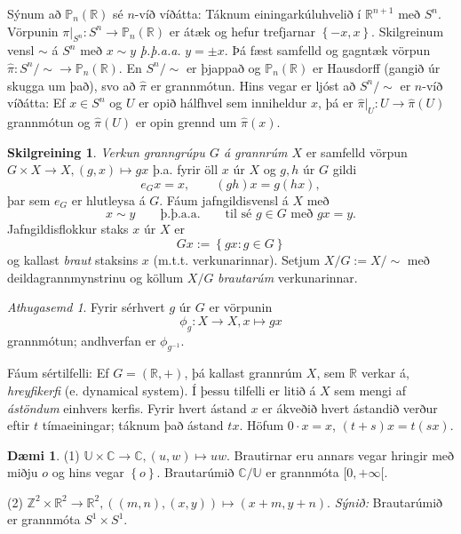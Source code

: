 \documentclass[a4paper,icelandic]{book}
\theoremstyle{definition}
\newtheorem{skilgr}{Skilgreining}[section]
\newtheorem{daemi}{Dæmi}[section]
\theoremstyle{plain}
\theoremstyle{remark}
\newtheorem*{ath}{Athugasemd}
\newcommand{\R}{\mathbb{R}} %
\newcommand{\Z}{\mathbb{Z}} %
\newcommand{\C}{\mathbb{C}} %
\begin{document}
Sýnum að $\mathbb P_n(\R)$ sé $n$-víð víðátta: Táknum einingarkúluhvelið
í $\R^{n+1}$ með $S^n$. Vörpunin $\pi|_{S^n} : S^n \to \mathbb P_n(\R)$
er átæk og hefur trefjarnar $\left\{ -x,x \right\}$. Skilgreinum vensl
$\sim$ á $S^n$ með $x\sim y$ \emph{þ.þ.a.a.} $y=\pm x$. Þá fæst samfelld
og gagntæk vörpun $\hat\pi : S^n/\sim \to \mathbb P_n(\R)$. En
$S^n/\sim$ er þjappað og $\mathbb P_n(\R)$ er Hausdorff (gangið úr
skugga um það), svo að $\hat\pi$ er grannmótun. Hins vegar er ljóst að
$S^n/\sim$ er $n$-víð víðátta: Ef $x\in S^n$ og $U$ er opið hálfhvel sem
inniheldur $x$, þá er $\hat\pi|_U : U \to \hat\pi(U)$ grannmótun og
$\hat\pi(U)$ er opin grennd um $\hat\pi(x)$. 

\begin{skilgr}
  \emph{Verkun granngrúpu $G$ á grannrúm $X$} er samfelld vörpun $G\times X\to X, (g,x)\mapsto gx$ þ.a.
  fyrir öll $x$ úr $X$ og $g,h$ úr $G$ gildi\[
  e_G x = x,
  \qquad (gh)x = g(hx),
  \]
  þar sem $e_G$ er hlutleysa á $G$. Fáum jafngildisvensl á $X$ með\[
  x\sim y
  \qquad\text{þ.þ.a.a.}\qquad
  \text{til sé } g\in G \text{ með } gx = y.
  \]
  Jafngildisflokkur staks $x$ úr $X$ er\[
  Gx := \left\{ gx : g\in G \right\}
  \]
  og kallast \emph{braut} staksins $x$ (m.t.t.
  verkunarinnar). Setjum $X/G := X/\sim$ með deildagrannmynstrinu og
  köllum $X/G$ \emph{brautarúm} verkunarinnar.
\end{skilgr}
\begin{ath}
  Fyrir sérhvert $g$ úr $G$ er vörpunin\[
  \phi_g : X\to X, x\mapsto gx
  \]
  grannmótun; andhverfan er $\phi_{g^{-1}}$. 
\end{ath}
Fáum sértilfelli: Ef $G = (\R,+)$, þá kallast grannrúm $X$, sem $\R$
verkar á, \emph{hreyfikerfi} (e. dynamical system). Í
þessu tilfelli er litið á $X$ sem mengi af \emph{ástöndum} einhvers
kerfis. Fyrir hvert ástand $x$ er ákveðið hvert ástandið verður eftir
$t$ tímaeiningar; táknum það ástand $tx$. Höfum $0\cdot x = x$, $(t+s)x
= t(sx)$. 

\begin{daemi}
  (1) $\mathbb U\times\C\to\C, (u,w)\mapsto uw$. Brautirnar eru annars
  vegar hringir með miðju $o$ og hins vegar $\left\{ o \right\}$.
  Brautarúmið $\C/\mathbb U$ er grannmóta $[0,+\infty[$. 

  (2) $\Z^2\times\R^2\to\R^2,\left( (m,n),(x,y)
  \right)\mapsto(x+m,y+n)$. \emph{Sýnið:} Brautarúmið er grannmóta
  $S^1\times S^1$.
\end{daemi}
\end{document}
